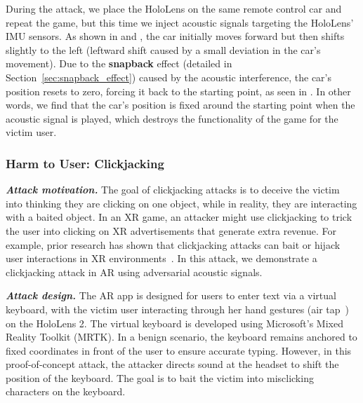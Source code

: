 During the attack, we place the HoloLens on the same remote control car and repeat the game, but this time we inject acoustic signals targeting the HoloLens' IMU sensors. As shown in  and , the car initially moves forward but then shifts slightly to the left (leftward shift caused by a small deviation in the car's movement). Due to the \textbf{snapback} effect (detailed in Section~\ref{sec:snapback_effect}) caused by the acoustic interference, the car’s position resets to zero, forcing it back to the starting point, as seen in  .
In other words, we find that the car's position is fixed around the starting point when the acoustic signal is played, which destroys the functionality of the game for the victim user. 







\subsubsection{Harm to User: Clickjacking} 
\label{sec:app_clickjacking}


\noindent \emph{\textbf{Attack motivation.}} The goal of clickjacking attacks is to deceive the victim into thinking they are clicking on one object, while in reality, they are interacting with a baited object. In an XR game, an attacker might use clickjacking to trick the user into clicking on XR advertisements that generate extra revenue. For example, prior research has shown that clickjacking attacks can bait or hijack user interactions in XR environments~\cite{cheng2024user, lee2021adcube}. In this attack, we demonstrate a clickjacking attack in AR using adversarial acoustic signals.

\noindent \emph{\textbf{Attack design.}} The AR app is designed for users to enter text via a virtual keyboard, with the victim user interacting through her hand gestures (air tap~\cite{hololens-gestures-intro}) on the HoloLens 2. The virtual keyboard is developed using Microsoft’s Mixed Reality Toolkit (MRTK). In a benign scenario, the keyboard remains anchored to fixed coordinates in front of the user to ensure accurate typing. However, in this proof-of-concept attack, the attacker directs sound at the headset to shift the position of the keyboard. 
The goal is to bait the victim into misclicking characters on the keyboard.



